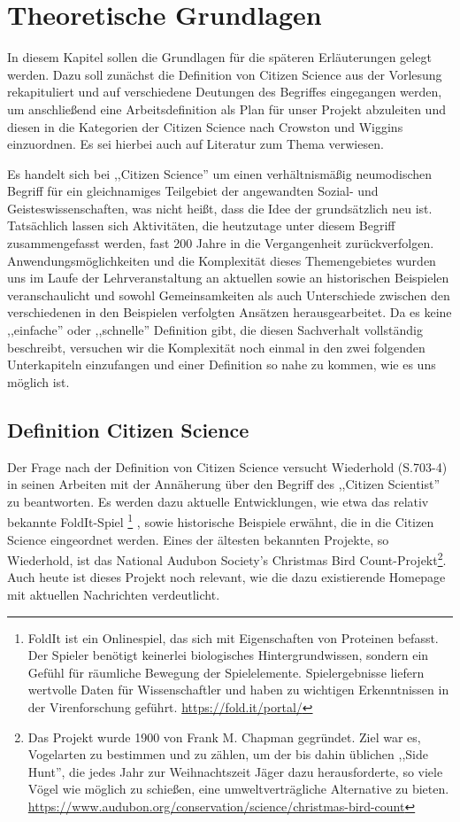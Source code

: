 \documentclass{article}
\begin{document}
\section{Theoretische Grundlagen}
In diesem Kapitel sollen die Grundlagen für die späteren Erläuterungen gelegt werden.
Dazu soll zunächst die Definition von Citizen Science aus der Vorlesung rekapituliert und auf verschiedene Deutungen des Begriffes eingegangen werden, um anschließend eine Arbeitsdefinition als Plan für unser Projekt abzuleiten und diesen in die Kategorien der Citizen Science nach Crowston und Wiggins einzuordnen.
Es sei hierbei auch auf Literatur zum Thema verwiesen.

Es handelt sich bei ,,Citizen Science'' um einen verhältnismäßig neumodischen Begriff
für ein gleichnamiges Teilgebiet der angewandten Sozial- und Geisteswissenschaften, was nicht heißt, dass die Idee der grundsätzlich neu ist.
Tatsächlich lassen sich Aktivitäten, die heutzutage unter diesem Begriff zusammengefasst werden,
fast 200 Jahre in die Vergangenheit zurückverfolgen.
Anwendungsmöglichkeiten und die Komplexität dieses Themengebietes
wurden uns im Laufe der Lehrveranstaltung an aktuellen sowie an historischen Beispielen veranschaulicht
und sowohl Gemeinsamkeiten als auch Unterschiede zwischen den verschiedenen in den Beispielen verfolgten Ansätzen herausgearbeitet.
Da es keine ,,einfache'' oder ,,schnelle'' Definition gibt, die diesen Sachverhalt vollständig beschreibt,
versuchen wir die Komplexität noch einmal in den zwei folgenden Unterkapiteln einzufangen
und einer Definition so nahe zu kommen, wie es uns möglich ist.

\subsection{Definition Citizen Science}
Der Frage nach der Definition von Citizen Science versucht Wiederhold\cite{Wiederhold} (S.703-4) in seinen Arbeiten mit der Annäherung über den Begriff des ,,Citizen Scientist'' zu beantworten.
Es werden dazu aktuelle Entwicklungen, wie etwa das relativ bekannte FoldIt-Spiel \footnote{
FoldIt ist ein Onlinespiel, das sich mit Eigenschaften von Proteinen befasst. Der Spieler benötigt keinerlei biologisches Hintergrundwissen, sondern ein Gefühl für räumliche Bewegung der Spielelemente. Spielergebnisse liefern wertvolle Daten für Wissenschaftler und haben zu wichtigen Erkenntnissen in der Virenforschung geführt. \url{https://fold.it/portal/}}
, sowie historische Beispiele erwähnt, die in die Citizen Science eingeordnet werden.
Eines der ältesten bekannten Projekte, so Wiederhold, ist das National Audubon Society's Christmas Bird Count-Projekt\footnote{Das Projekt wurde 1900 von Frank M. Chapman gegründet.
Ziel war es, Vogelarten zu bestimmen und zu zählen, um der bis dahin üblichen ,,Side Hunt'',
die jedes Jahr zur Weihnachtszeit Jäger dazu herausforderte, so viele Vögel wie möglich zu schießen,
eine umweltverträgliche Alternative zu bieten. \url{https://www.audubon.org/conservation/science/christmas-bird-count}}.
Auch heute ist dieses Projekt noch relevant, wie die dazu existierende Homepage mit aktuellen Nachrichten verdeutlicht.
\end{document}
